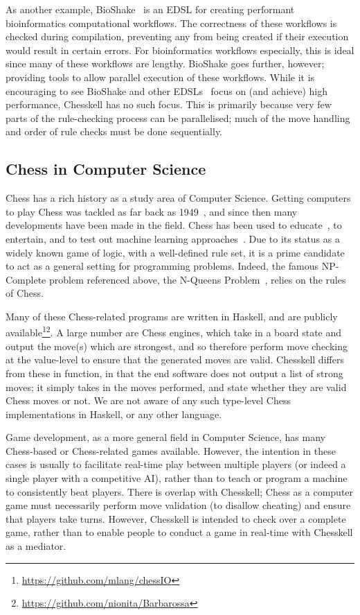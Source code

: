 As another example, BioShake~\cite{bioshake} is an EDSL for creating performant bioinformatics computational workflows. The correctness of these workflows is checked during compilation, preventing any from being created if their execution would result in certain errors. For bioinformatics workflows especially, this is ideal since many of these workflows are lengthy. BioShake goes further, however; providing tools to allow parallel execution of these workflows. While it is encouraging to see BioShake and other EDSLs~\cite{aplite} focus on (and achieve) high performance, Chesskell has no such focus. This is primarily because very few parts of the rule-checking process can be parallelised; much of the move handling and order of rule checks must be done sequentially.

\subsection{Chess in Computer Science}

Chess has a rich history as a study area of Computer Science. Getting computers to play Chess was tackled as far back as 1949~\cite{1949chess}, and since then many developments have been made in the field. Chess has been used to educate~\cite{chesseducation}, to entertain, and to test out machine learning approaches~\cite{chessml}. Due to its status as a widely known game of logic, with a well-defined rule set, it is a prime candidate to act as a general setting for programming problems. Indeed, the famous NP-Complete problem referenced above, the N-Queens Problem~\cite{nqueensnp}, relies on the rules of Chess.

Many of these Chess-related programs are written in Haskell, and are publicly available\footnote{\url{https://github.com/mlang/chessIO}}\footnote{\url{https://github.com/nionita/Barbarossa}}. A large number are Chess engines, which take in a board state and output the move(s) which are strongest, and so therefore perform move checking at the value-level to ensure that the generated moves are valid. Chesskell differs from these in function, in that the end software does not output a list of strong moves; it simply takes in the moves performed, and state whether they are valid Chess moves or not. We are not aware of any such type-level Chess implementations in Haskell, or any other language.

Game development, as a more general field in Computer Science, has many Chess-based or Chess-related games available. However, the intention in these cases is usually to facilitate real-time play between multiple players (or indeed a single player with a competitive AI), rather than to teach or program a machine to consistently beat players. There is overlap with Chesskell; Chess as a computer game must necessarily perform move validation (to disallow cheating) and ensure that players take turns. However, Chesskell is intended to check over a complete game, rather than to enable people to conduct a game in real-time with Chesskell as a mediator.

